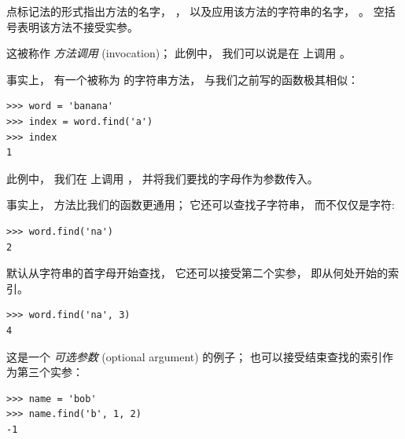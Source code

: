 点标记法的形式指出方法的名字， ， 以及应用该方法的字符串的名字， 。  空括号表明该方法不接受实参。


这被称作 {\em 方法调用} (invocation)； 此例中， 我们可以说是在  上调用  。


事实上， 有一个被称为  的字符串方法， 与我们之前写的函数极其相似：

\begin{lstlisting}
>>> word = 'banana'
>>> index = word.find('a')
>>> index
1
\end{lstlisting}

%

此例中， 我们在  上调用  ， 并将我们要找的字母作为参数传入。


事实上，  方法比我们的函数更通用； 它还可以查找子字符串， 而不仅仅是字符:

\begin{lstlisting}
>>> word.find('na')
2
\end{lstlisting}

%
  

 默认从字符串的首字母开始查找， 它还可以接受第二个实参， 即从何处开始的索引。

\begin{lstlisting}
>>> word.find('na', 3)
4
\end{lstlisting}

%

这是一个 {\em 可选参数} (optional argument) 的例子；  也可以接受结束查找的索引作为第三个实参：

\begin{lstlisting}
>>> name = 'bob'
>>> name.find('b', 1, 2)
-1
\end{lstlisting}

